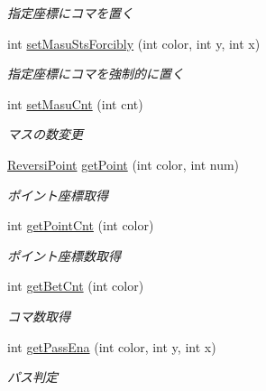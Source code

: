 \begin{DoxyCompactItemize}
\begin{DoxyCompactList}\small\item\em 指定座標にコマを置く \end{DoxyCompactList}\item 
int \hyperlink{classjp_1_1gr_1_1java__conf_1_1yuta__yoshinaga_1_1reversi_1_1model_1_1_reversi_af2ba1c808c067c94106d04ccd5e25e3b}{set\+Masu\+Sts\+Forcibly} (int color, int y, int x)
\begin{DoxyCompactList}\small\item\em 指定座標にコマを強制的に置く \end{DoxyCompactList}\item 
int \hyperlink{classjp_1_1gr_1_1java__conf_1_1yuta__yoshinaga_1_1reversi_1_1model_1_1_reversi_a0e9bc15d570635cf024287fbf541b4b9}{set\+Masu\+Cnt} (int cnt)
\begin{DoxyCompactList}\small\item\em マスの数変更 \end{DoxyCompactList}\item 
\hyperlink{classjp_1_1gr_1_1java__conf_1_1yuta__yoshinaga_1_1reversi_1_1model_1_1_reversi_point}{Reversi\+Point} \hyperlink{classjp_1_1gr_1_1java__conf_1_1yuta__yoshinaga_1_1reversi_1_1model_1_1_reversi_ab180757b310c3a72cf159043ba0dc09e}{get\+Point} (int color, int num)
\begin{DoxyCompactList}\small\item\em ポイント座標取得 \end{DoxyCompactList}\item 
int \hyperlink{classjp_1_1gr_1_1java__conf_1_1yuta__yoshinaga_1_1reversi_1_1model_1_1_reversi_a8ab289d67a725a30e92411c90b755bd8}{get\+Point\+Cnt} (int color)
\begin{DoxyCompactList}\small\item\em ポイント座標数取得 \end{DoxyCompactList}\item 
int \hyperlink{classjp_1_1gr_1_1java__conf_1_1yuta__yoshinaga_1_1reversi_1_1model_1_1_reversi_a9f826e110ec3298a6bc5d6987a94519c}{get\+Bet\+Cnt} (int color)
\begin{DoxyCompactList}\small\item\em コマ数取得 \end{DoxyCompactList}\item 
int \hyperlink{classjp_1_1gr_1_1java__conf_1_1yuta__yoshinaga_1_1reversi_1_1model_1_1_reversi_aecdacb362bc174ee98b1013789461310}{get\+Pass\+Ena} (int color, int y, int x)
\begin{DoxyCompactList}\small\item\em パス判定 \end{DoxyCompactList}\item 

\end{DoxyCompactItemize}
